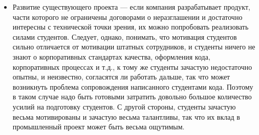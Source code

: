 \documentclass[a5paper]{article}
\begin{document}
\begin{itemize}
	\item Развитие существующего проекта --- если компания разрабатывает продукт, части которого не ограничены договорами о неразглашении и достаточно интересны с технической точки зрения, их можно попробовать реализовать силами студентов. Следует, однако, понимать, что мотивация студентов сильно отличается от мотивации штатных сотрудников, и студенты ничего не знают о корпоративных стандартах качества, оформления кода, корпоративных процессах и т.д., к тому же студенты зачастую недостаточно опытны, и неизвестно, согласятся ли работать дальше, так что может возникнуть проблема сопровождения написанного студентами кода. Поэтому в таком случае надо быть готовыми затратить довольно большое количество усилий на подготовку студентов. С другой стороны, студенты зачастую весьма мотивированы и зачастую весьма талантливы, так что их вклад в промышленный проект может быть весьма ощутимым.
\end{itemize}
\end{document}
